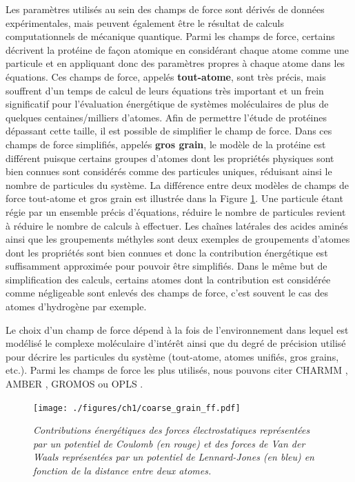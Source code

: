 Les paramètres utilisés au sein des champs de force sont dérivés de données expérimentales, mais peuvent également être le résultat de calculs computationnels de mécanique quantique. Parmi les champs de force, certains décrivent la protéine de façon atomique en considérant chaque atome comme une particule et en appliquant donc des paramètres propres à chaque atome dans les équations. Ces champs de force, appelés \textbf{tout-atome}, sont très précis, mais souffrent d'un temps de calcul de leurs équations très important et un frein significatif pour l'évaluation énergétique de systèmes moléculaires de plus de quelques centaines/milliers d'atomes. Afin de permettre l'étude de protéines dépassant cette taille, il est possible de simplifier le champ de force. Dans ces champs de force simplifiés, appelés \textbf{gros grain}, le modèle de la protéine est différent puisque certains groupes d'atomes dont les propriétés physiques sont bien connues sont considérés comme des particules uniques, réduisant ainsi le nombre de particules du système. La différence entre deux modèles de champs de force tout-atome et gros grain est illustrée dans la Figure \ref{Fig:coarse_grain_ff}. Une particule étant régie par un ensemble précis d'équations, réduire le nombre de particules revient à réduire le nombre de calculs à effectuer. Les chaînes latérales des acides aminés ainsi que les groupements méthyles sont deux exemples de groupements d'atomes dont les propriétés sont bien connues et donc la contribution énergétique est suffisamment approximée pour pouvoir être simplifiés. Dans le même but de simplification des calculs, certains atomes dont la contribution est considérée comme négligeable sont enlevés des champs de force, c'est souvent le cas des atomes d'hydrogène par exemple.

Le choix d'un champ de force dépend à la fois de l'environnement dans lequel est modélisé le complexe moléculaire d'intérêt ainsi que du degré de précision utilisé pour décrire les particules du système (tout-atome, atomes unifiés, gros grains, etc.). Parmi les champs de force les plus utilisés, nous pouvons citer CHARMM \cite{brooks2009charmm}, AMBER \cite{pearlman1995amber}, GROMOS \cite{oostenbrink2004biomolecular} ou OPLS \cite{jorgensen1996development}.

\begin{figure}
  \centering
  {\texttt{[image: ./figures/ch1/coarse\_grain\_ff.pdf]}}
    \caption{\it Contributions énergétiques des forces électrostatiques représentées par un potentiel de Coulomb (en rouge) et des forces de Van der Waals représentées par un potentiel de Lennard-Jones (en bleu) en fonction de la distance entre deux atomes.}
    \label{Fig:coarse_grain_ff}
  \hspace{0.2cm}
\end{figure}

